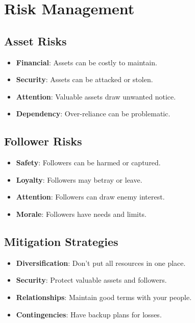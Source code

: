 \section{Risk Management}

\subsection*{Asset Risks}
\begin{itemize}
\item \textbf{Financial}: Assets can be costly to maintain.
\item \textbf{Security}: Assets can be attacked or stolen.
\item \textbf{Attention}: Valuable assets draw unwanted notice.
\item \textbf{Dependency}: Over-reliance can be problematic.
\end{itemize}

\subsection*{Follower Risks}
\begin{itemize}
\item \textbf{Safety}: Followers can be harmed or captured.
\item \textbf{Loyalty}: Followers may betray or leave.
\item \textbf{Attention}: Followers can draw enemy interest.
\item \textbf{Morale}: Followers have needs and limits.
\end{itemize}

\subsection*{Mitigation Strategies}
\begin{itemize}
\item \textbf{Diversification}: Don't put all resources in one place.
\item \textbf{Security}: Protect valuable assets and followers.
\item \textbf{Relationships}: Maintain good terms with your people.
\item \textbf{Contingencies}: Have backup plans for losses.
\end{itemize}


